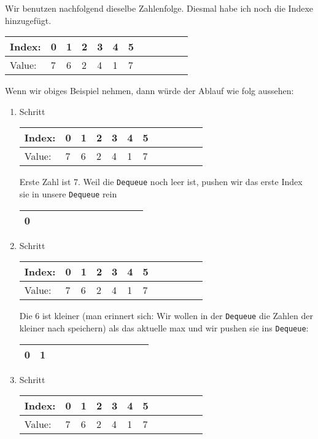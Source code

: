 \documentclass[babel]{book}
\begin{document}
Wir benutzen nachfolgend dieselbe Zahlenfolge. Diesmal habe ich noch die Indexe hinzugefügt.

	\begin{tabular}{|l|l|l|l|l|l|l|l|l|l|l|l|} 
		\hline
		Index: & 0 & 1 & 2 & 3 & 4 & 5\\ 
		\hline
		Value: & 7 & 6 & 2 & 4 & 1 & 7\\
		\hline
	\end{tabular}


Wenn wir obiges Beispiel nehmen, dann würde der Ablauf wie folg aussehen:
\begin{enumerate} 
	\item Schritt
	
	\begin{tabular}{|l|l|l|l|l|l|l|l|l|l|l|l|} 
		\hline
		Index: & \cellcolor{yellow!25}0 & 1 & 2 & 3 & 4 & 5\\ 
		\hline
		Value: & \cellcolor{blue!25}7 & 6 & 2 & 4 & 1 & 7\\
		\hline
	\end{tabular}
		
	Erste Zahl ist 7. Weil die \lstinline|Dequeue| noch leer ist, pushen wir das erste Index sie in unsere \lstinline|Dequeue| rein	\begin{tabular}{|l|l|l|l|l|l|l|l|l|l|l|l|} 
		\hline
		0 \\
		\hline
	\end{tabular} 
	\item Schritt
	
	\begin{tabular}{|l|l|l|l|l|l|l|l|l|l|l|l|} 
		\hline
		Index: & \cellcolor{yellow!25}0 & \cellcolor{yellow!25}1 & 2 & 3 & 4 & 5\\ 
		\hline
		Value: & \cellcolor{blue!25}7 & \cellcolor{blue!25}6 & 2 & 4 & 1 & 7\\
		\hline
	\end{tabular}
		
	Die 6 ist kleiner (man erinnert sich: Wir wollen in der \lstinline|Dequeue| die Zahlen der kleiner nach speichern) als das aktuelle max und wir pushen sie ins \lstinline|Dequeue|: 	\begin{tabular}{|l|l|l|l|l|l|l|l|l|l|l|l|} 
		\hline
		0 & 1 \\
		\hline
	\end{tabular} 
	
	\item Schritt
	
	\begin{tabular}{|l|l|l|l|l|l|l|l|l|l|l|l|} 
		\hline
		Index: & \cellcolor{yellow!25}0 & \cellcolor{yellow!25}1 & \cellcolor{yellow!25}2 & 3 & 4 & 5\\ 
		\hline
		Value: & \cellcolor{blue!25}7 & \cellcolor{blue!25}6 & \cellcolor{blue!25}2 & 4 & 1 & 7\\
		\hline
	\end{tabular}
	

\end{enumerate}
\end{document}
